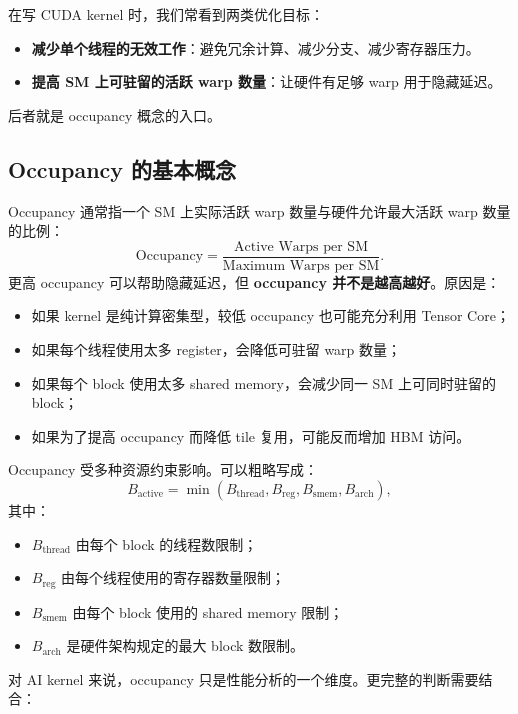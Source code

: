 在写 CUDA kernel 时，我们常看到两类优化目标：

\begin{itemize}
  \item \textbf{减少单个线程的无效工作}：避免冗余计算、减少分支、减少寄存器压力。
  \item \textbf{提高 SM 上可驻留的活跃 warp 数量}：让硬件有足够 warp 用于隐藏延迟。
\end{itemize}

后者就是 occupancy 概念的入口。

\subsection{Occupancy 的基本概念}
\label{subsec:occupancy}

Occupancy 通常指一个 SM 上实际活跃 warp 数量与硬件允许最大活跃 warp 数量的比例：
\[
  \mathrm{Occupancy}
  =
  \frac{\text{Active Warps per SM}}{\text{Maximum Warps per SM}}.
\]
更高 occupancy 可以帮助隐藏延迟，但 \textbf{occupancy 并不是越高越好}。原因是：

\begin{itemize}
  \item 如果 kernel 是纯计算密集型，较低 occupancy 也可能充分利用 Tensor Core；
  \item 如果每个线程使用太多 register，会降低可驻留 warp 数量；
  \item 如果每个 block 使用太多 shared memory，会减少同一 SM 上可同时驻留的 block；
  \item 如果为了提高 occupancy 而降低 tile 复用，可能反而增加 HBM 访问。
\end{itemize}

Occupancy 受多种资源约束影响。可以粗略写成：
\[
  B_{\mathrm{active}}
  =
  \min
  \left(
    B_{\mathrm{thread}},
    B_{\mathrm{reg}},
    B_{\mathrm{smem}},
    B_{\mathrm{arch}}
  \right),
\]
其中：

\begin{itemize}
  \item $B_{\mathrm{thread}}$ 由每个 block 的线程数限制；
  \item $B_{\mathrm{reg}}$ 由每个线程使用的寄存器数量限制；
  \item $B_{\mathrm{smem}}$ 由每个 block 使用的 shared memory 限制；
  \item $B_{\mathrm{arch}}$ 是硬件架构规定的最大 block 数限制。
\end{itemize}

对 AI kernel 来说，occupancy 只是性能分析的一个维度。更完整的判断需要结合：

